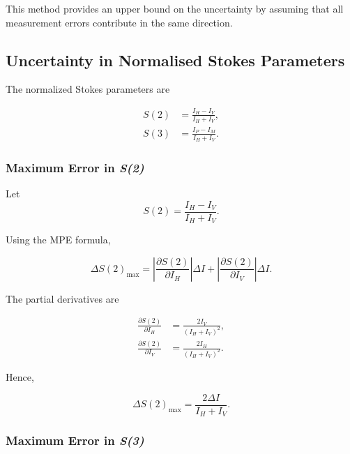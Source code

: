 This method provides an upper bound on the uncertainty by assuming that all measurement errors contribute in the same direction.

\subsection{Uncertainty in Normalised Stokes Parameters}

The normalized Stokes parameters are

\begin{subequations}
    \begin{align}
    S(2) &= \frac{I_H-I_V}{I_H+I_V}, \\
    S(3) &= \frac{I_P-I_M}{I_H+I_V}.
    \end{align}
\end{subequations}

\subsubsection{Maximum Error in \textit{S(2)}}

Let
\[
S(2)=\frac{I_H-I_V}{I_H+I_V}.
\]

Using the MPE formula,

\begin{equation}
\Delta S(2)_{\max}
=
\left|\frac{\partial S(2)}{\partial I_H}\right|\Delta I
+
\left|\frac{\partial S(2)}{\partial I_V}\right|\Delta I .
\end{equation}

The partial derivatives are

\begin{subequations}
    \begin{align}
    \frac{\partial S(2)}{\partial I_H}
    &=\frac{2I_V}{(I_H+I_V)^2},\\
    \frac{\partial S(2)}{\partial I_V}
    &=\frac{2I_H}{(I_H+I_V)^2}.
    \end{align}
\end{subequations}

Hence,

\begin{equation}
\boxed{
\Delta S(2)_{\max}
=
\frac{2\Delta I}{I_H+I_V}.
}
\end{equation}

\subsubsection{Maximum Error in \textit{S(3)}}

